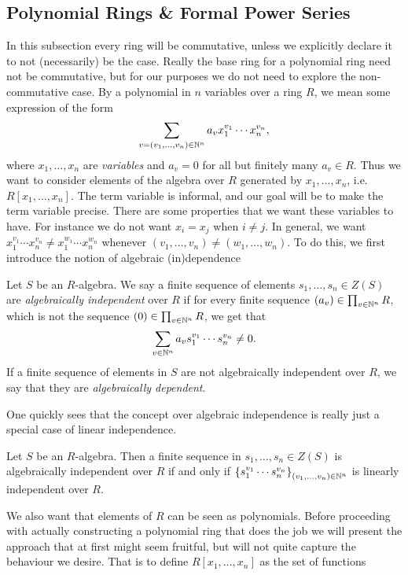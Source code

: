 \subsection{Polynomial Rings \& Formal Power Series}
In this subsection every ring will be commutative, unless we explicitly declare it to not (necessarily) be the case. Really the base ring for a polynomial ring need not be commutative, but for our purposes we do not need to explore the non-commutative case. By a polynomial in $n$ variables over a ring $R$, we mean some expression of the form 
$$\sum_{v=(v_1,\dots,v_n)\in \mathbb{N}^n} a_vx_1^{v_1}\cdots x_n^{v_n},$$
where $x_1,\dots,x_n$ are \textit{variables} and $a_v = 0$ for all but finitely many $a_v\in R$. Thus we want to consider elements of the algebra over $R$ generated by $x_1,\dots,x_n$, i.e. $R[x_1,\dots,x_n]$. The term variable is informal, and our goal will be to make the term variable precise. There are some properties that we want these variables to have. For instance we do not want $x_i = x_j$ when $i\neq j$. In general, we want $x_1^{v_1}\cdots x_n^{v_n} \neq x_1^{w_1}\cdots x_n^{w_n}$ whenever $(v_1,\dots,v_n)\neq (w_1,\dots,w_n)$. To do this, we first introduce the notion of algebraic (in)dependence
\begin{definition}
    Let $S$ be an $R$-algebra. We say a finite sequence of elements 
    $s_1,\dots,s_n\in Z(S)$ are \textit{algebraically independent} over $R$ if for every 
    finite sequence $(a_v)\in \prod_{v\in \mathbb{N}^n} R$, which is not the sequence $(0)\in \prod_{v\in \mathbb{N}^n} R$, we get that 
    $$\sum_{v\in \mathbb{N}^n} a_v s_1^{v_1}\cdots s_n^{v_n} \neq 0.$$
    If a finite sequence of elements in $S$ are not algebraically independent over $R$, we say that they are \textit{algebraically dependent}. 
\end{definition}
One quickly sees that the concept over algebraic independence is really just a special case of linear independence.
\begin{lemma}\label{AlgebraicallyIndependentIffMonomialsLinearlyIndependent}
    Let $S$ be an $R$-algebra. Then a finite sequence in $s_1,\dots,s_n \in Z(S)$ is algebraically independent over $R$ if and only if $\left\{s_1^{v_1}\cdots s_n^{v_n}\right\}_{(v_1,\dots,v_n)\in \mathbb{N}^n}$ is linearly independent over $R$.
\end{lemma}
We also want that elements of $R$ can be seen as polynomials. Before proceeding with actually constructing a polynomial ring that does the job we will present the approach that at first might seem fruitful, but will not quite capture the behaviour we desire. That is to define $R[x_1,\dots,x_n]$ as the set of functions 
